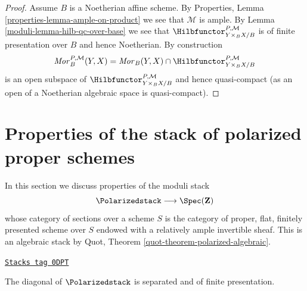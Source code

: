 \begin{proof}
\medskip\noindent
Assume $B$ is a Noetherian affine scheme. By
Properties, Lemma \ref{properties-lemma-ample-on-product}
we see that $\mathcal{M}$ is ample. By Lemma \ref{moduli-lemma-hilb-qc-over-base}
we see that $\Hilbfunctor^{P, \mathcal{M}}_{Y \times_B X/B}$ is of
finite presentation over $B$ and hence Noetherian.
By construction
$$
\mathit{Mor}^{P, \mathcal{M}}_B(Y, X) =
\mathit{Mor}_B(Y, X) \cap
\Hilbfunctor^{P, \mathcal{M}}_{Y \times_B X/B}
$$
is an open subspace of $\Hilbfunctor^{P, \mathcal{M}}_{Y \times_B X/B}$ and
hence quasi-compact (as an open of a Noetherian algebraic space
is quasi-compact).
\end{proof}

\section{Properties of the stack of polarized proper schemes}
\label{moduli-section-polarized}
In this section we discuss properties of the moduli stack
$$
\Polarizedstack \longrightarrow \Spec(\mathbf{Z})
$$
whose category of sections over a scheme $S$ is the category of
proper, flat, finitely presented scheme over $S$ endowed
with a relatively ample invertible sheaf. This is an algebraic
stack by Quot, Theorem \ref{quot-theorem-polarized-algebraic}.

\begin{lemma}
\label{moduli-lemma-polarized-diagonal-separated-fp}
\href{https://stacks.math.columbia.edu/tag/0DPT}{\texttt{Stacks tag 0DPT}}

The diagonal of $\Polarizedstack$ is separated
and of finite presentation.
\end{lemma}

